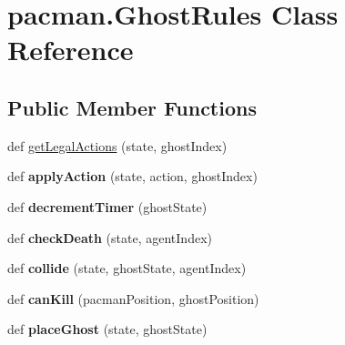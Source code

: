 \hypertarget{classpacman_1_1_ghost_rules}{}\section{pacman.\+Ghost\+Rules Class Reference}
\label{classpacman_1_1_ghost_rules}
\subsection*{Public Member Functions}
\begin{DoxyCompactItemize}
\item 
def \hyperlink{classpacman_1_1_ghost_rules_a48577275f722505c68d595515c53859b}{get\+Legal\+Actions} (state, ghost\+Index)
\item 
\mbox{\label{classpacman_1_1_ghost_rules_a37c28017fa5b59bc17ba6d580e4f0a21}} 
def {\bfseries apply\+Action} (state, action, ghost\+Index)
\item 
\mbox{\label{classpacman_1_1_ghost_rules_aeaa76146bcebc36df5bb426159be884e}} 
def {\bfseries decrement\+Timer} (ghost\+State)
\item 
\mbox{\label{classpacman_1_1_ghost_rules_a495c986813866509cd1985121e0f50c6}} 
def {\bfseries check\+Death} (state, agent\+Index)
\item 
\mbox{\label{classpacman_1_1_ghost_rules_a9e1a57075b0fbf2d91721fccff6ec276}} 
def {\bfseries collide} (state, ghost\+State, agent\+Index)
\item 
\mbox{\label{classpacman_1_1_ghost_rules_a12f9bc228959d00755fbc3d7c6d99649}} 
def {\bfseries can\+Kill} (pacman\+Position, ghost\+Position)
\item 
\mbox{\label{classpacman_1_1_ghost_rules_aece2f6e41fe172273fd634b54eabcec0}} 
def {\bfseries place\+Ghost} (state, ghost\+State)
\end{DoxyCompactItemize}
